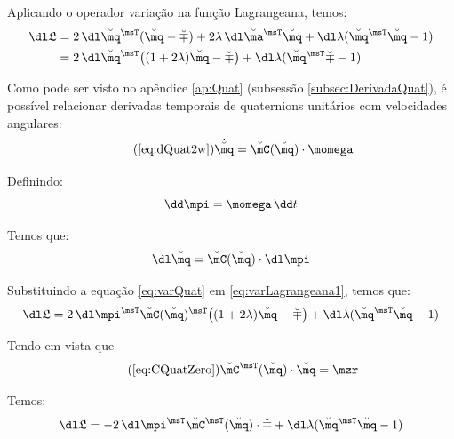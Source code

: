 \documentclass[]{politex}
\begin{document}
Aplicando o operador variação na função Lagrangeana, temos:
\begin{equation} \label{eq:varLagrangeana1}
\begin{split}
\dl \mathfrak{L} &= 2 \, \dl \breve{\mq}^\msT (\breve{\mq} -\breve{\mp}) + 2\lambda \, \dl \breve{\ma}^\msT \breve{\mq} + \dl \lambda(\breve{\mq}^\msT \breve{\mq} - 1) \\
&= 2 \, \dl \breve{\mq}^\msT \big((1+2\lambda)\breve{\mq} -\breve{\mp} \big) + \dl \lambda(\breve{\mq}^\msT \breve{\mp} - 1) \\
\end{split}
\end{equation}

Como pode ser visto no apêndice \ref{ap:Quat} (subsessão \ref{subsec:DerivadaQuat}), é possível relacionar derivadas temporais de quaternions unitários com velocidades angulares:
\begin{equation} \tag{\ref{eq:dQuat2w}}
\dot{\breve{\mq}} = \breve{\mC}(\breve{\mq}) \cdot \momega
\end{equation}

Definindo:
\begin{equation}
\dd \mpi = \momega  \, \dd t
\end{equation}

Temos que:
\begin{equation} \label{eq:varQuat}
\dl \breve{\mq} = \breve{\mC}(\breve{\mq}) \cdot \dl \mpi
\end{equation}

Substituindo a equação \eqref{eq:varQuat} em \eqref{eq:varLagrangeana1}, temos que:
\begin{equation}
\dl \mathfrak{L} = 2 \, \dl \mpi^\msT \breve{\mC}(\breve{\mq})^\msT \big((1+2\lambda)\breve{\mq} -\breve{\mp} \big) + \dl \lambda(\breve{\mq}^\msT \breve{\mq} - 1) \\
\end{equation}

Tendo em vista que
\begin{equation} \tag{\ref{eq:CQuatZero}}
\breve{\mC}^\msT (\breve{\mq})\cdot \breve{\mq} = \mzr
\end{equation}

Temos:
\begin{equation}
\dl \mathfrak{L} = -2 \, \dl \mpi^\msT \breve{\mC}^\msT (\breve{\mq}) \cdot \breve{\mp}  + \dl \lambda(\breve{\mq}^\msT \breve{\mq} - 1) \\
\end{equation}
\end{document}
